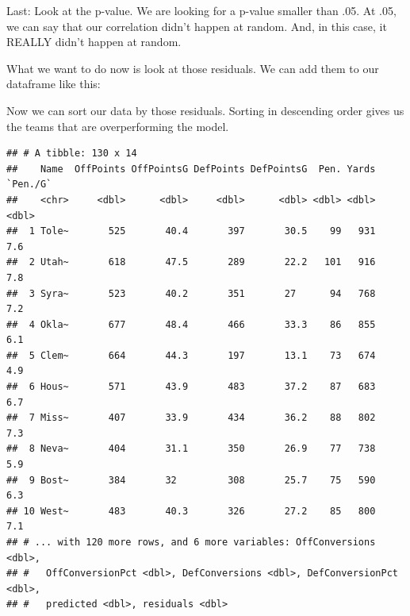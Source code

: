\documentclass[]{book}
\newenvironment{Shaded}{\begin{snugshade}}{\end{snugshade}}
\newcommand{\KeywordTok}[1]{\textcolor[rgb]{0.13,0.29,0.53}{\textbf{#1}}}
\newcommand{\NormalTok}[1]{#1}
\newcommand{\OperatorTok}[1]{\textcolor[rgb]{0.81,0.36,0.00}{\textbf{#1}}}
\newcommand{\StringTok}[1]{\textcolor[rgb]{0.31,0.60,0.02}{#1}}
\begin{document}
Last: Look at the p-value. We are looking for a p-value smaller than .05. At .05, we can say that our correlation didn't happen at random. And, in this case, it REALLY didn't happen at random.

What we want to do now is look at those residuals. We can add them to our dataframe like this:

\begin{Shaded}
\end{Shaded}

Now we can sort our data by those residuals. Sorting in descending order gives us the teams that are overperforming the model.

\begin{Shaded}
\end{Shaded}

\begin{verbatim}
## # A tibble: 130 x 14
##    Name  OffPoints OffPointsG DefPoints DefPointsG  Pen. Yards `Pen./G`
##    <chr>     <dbl>      <dbl>     <dbl>      <dbl> <dbl> <dbl>    <dbl>
##  1 Tole~       525       40.4       397       30.5    99   931      7.6
##  2 Utah~       618       47.5       289       22.2   101   916      7.8
##  3 Syra~       523       40.2       351       27      94   768      7.2
##  4 Okla~       677       48.4       466       33.3    86   855      6.1
##  5 Clem~       664       44.3       197       13.1    73   674      4.9
##  6 Hous~       571       43.9       483       37.2    87   683      6.7
##  7 Miss~       407       33.9       434       36.2    88   802      7.3
##  8 Neva~       404       31.1       350       26.9    77   738      5.9
##  9 Bost~       384       32         308       25.7    75   590      6.3
## 10 West~       483       40.3       326       27.2    85   800      7.1
## # ... with 120 more rows, and 6 more variables: OffConversions <dbl>,
## #   OffConversionPct <dbl>, DefConversions <dbl>, DefConversionPct <dbl>,
## #   predicted <dbl>, residuals <dbl>
\end{verbatim}
\end{document}
